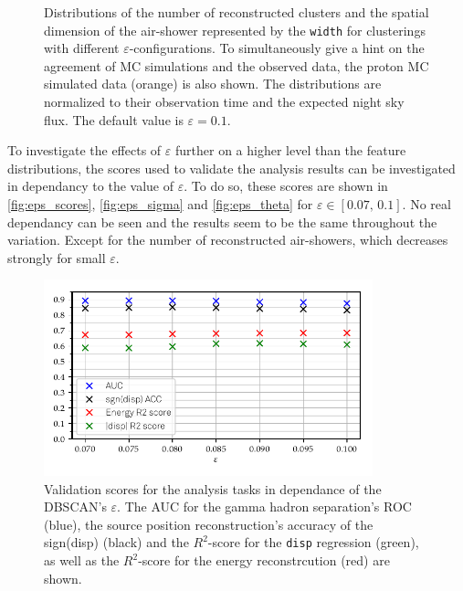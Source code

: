 \begin{figure}
\begin{subfigure}{0.5\textwidth}
  \end{subfigure}
  \caption{Distributions of the number of reconstructed
  clusters and the spatial dimension of the air-shower represented by the
  \texttt{width} for clusterings with different $\varepsilon$-configurations. To simultaneously give a hint on the agreement of MC simulations and the observed data, the proton MC simulated data (orange) is also shown. The distributions are normalized to their observation time and the expected night sky flux. The default value is $\varepsilon = 0.1$.}
  \label{fig:eps_feat3}
\end{figure}
%
To investigate the effects of $\varepsilon$ further on a higher level than the
feature distributions, the scores used to validate the analysis results can be
investigated in dependancy to the value of $\varepsilon$. To do so, these
scores are shown in \autoref{fig:eps_scores}, \ref{fig:eps_sigma} and
\ref{fig:eps_theta} for $\varepsilon \in [0.07,\,0.1]$. No real dependancy can
be seen and the results seem to be the same throughout the variation. Except
for the number of reconstructed air-showers, which decreases strongly for small
$\varepsilon$.
%
\begin{figure}
  \centering
  \includegraphics[width=0.85\textwidth]{Plots/Epsilon/eps_scores.pdf}
  \caption{Validation scores for the analysis tasks in dependance of the DBSCAN's $\varepsilon$. The AUC for the gamma hadron separation's ROC (blue), the source position reconstruction's accuracy of the sign(disp) (black) and the $R^2$-score for the \texttt{disp} regression (green), as well as the $R^2$-score for the energy reconstrcution (red) are shown.}
  \label{fig:eps_scores}
\end{figure}
%
